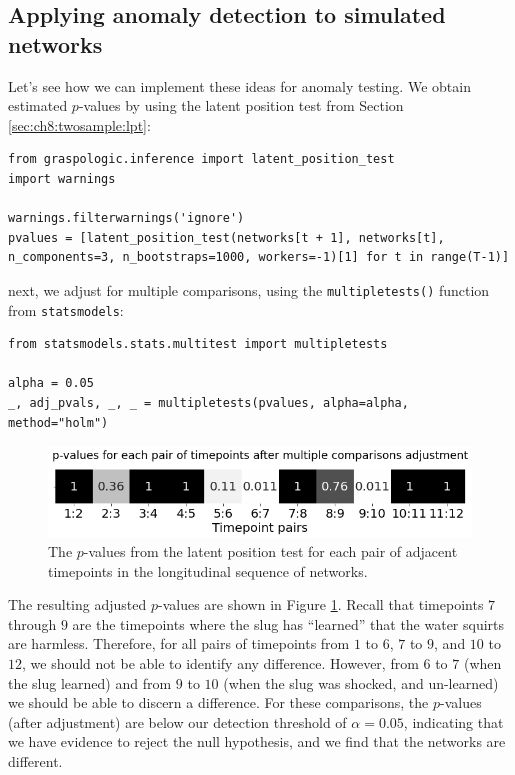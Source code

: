\subsection{Applying anomaly detection to simulated networks}

Let's see how we can implement these ideas for anomaly testing. We obtain estimated $p$-values by using the latent position test from Section \ref{sec:ch8:twosample:lpt}:

\begin{lstlisting}[style=python]
from graspologic.inference import latent_position_test
import warnings

warnings.filterwarnings('ignore')
pvalues = [latent_position_test(networks[t + 1], networks[t], n_components=3, n_bootstraps=1000, workers=-1)[1] for t in range(T-1)]
\end{lstlisting}

next, we adjust for multiple comparisons, using the \texttt{multipletests()} function from \texttt{statsmodels}:

\begin{lstlisting}[style=python]
from statsmodels.stats.multitest import multipletests

alpha = 0.05
_, adj_pvals, _, _ = multipletests(pvalues, alpha=alpha, method="holm")
\end{lstlisting}

\begin{figure}
    \centering
    \includegraphics[width=\linewidth]{applications/ch9/Images/anom_pvals.png}
    \caption[Anomaly detection $p$-values]{The $p$-values from the latent position test for each pair of adjacent timepoints in the longitudinal sequence of networks.}
    \label{fig:ch9:anomaly:pvals}
\end{figure}
The resulting adjusted $p$-values are shown in Figure \ref{fig:ch9:anomaly:pvals}. Recall that timepoints $7$ through $9$ are the timepoints where the slug has ``learned'' that the water squirts are harmless. Therefore, for all pairs of timepoints from $1$ to $6$, $7$ to $9$, and $10$ to $12$, we should not be able to identify any difference. However, from $6$ to $7$ (when the slug learned) and from $9$ to $10$ (when the slug was shocked, and un-learned) we should be able to discern a difference. For these comparisons, the $p$-values (after adjustment) are below our detection threshold of $\alpha = 0.05$, indicating that we have evidence to reject the null hypothesis, and we find that the networks are different.